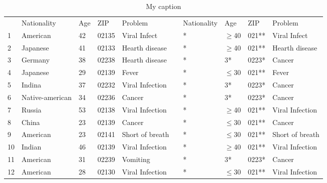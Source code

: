 \documentclass{llncs}
\begin{document}
\begin{table}[]
	\centering
	\caption{My caption}
	\label{my-label}
	\begin{tabular}{@{}llllllllll@{}}
		\cmidrule(lr){2-5} \cmidrule(l){7-10}
		& Nationality     & Age & ZIP   & Problem         &  & Nationality & Age      & ZIP   & Problem         \\ \cmidrule(lr){2-5} \cmidrule(l){7-10} 
		1  & American        & 42  & 02135 & Viral Infect    &  & *           & $\geq$40 & 021** & Viral Infect    \\
		2  & Japanese        & 41  & 02133 & Hearth disease  &  & *           & $\geq$40 & 021** & Hearth disease  \\
		3  & Germany         & 38  & 02238 & Hearth disease  &  & *           & 3*       & 0223* & Cancer          \\
		4  & Japanese        & 29  & 02139 & Fever           &  & *           & $\leq$30 & 021** & Fever           \\
		5  & Indina          & 37  & 02232 & Viral Infection &  & *           & 3*       & 0223* & Cancer          \\
		6  & Native-american & 34  & 02236 & Cancer          &  & *           & 3*       & 0223* & Cancer          \\
		7  & Russia          & 53  & 02138 & Viral Infection &  & *           & $\geq$40 & 021** & Viral Infection \\
		8  & China           & 23  & 02139 & Cancer          &  & *           & $\leq$30 & 021** & Cancer          \\
		9  & American        & 23  & 02141 & Short of breath &  & *           & $\leq$30 & 021** & Short of breath \\
		10 & Indian          & 46  & 02139 & Viral Infection &  & *           & $\geq$40 & 021** & Viral Infection \\
		11 & American        & 31  & 02239 & Vomiting        &  & *           & 3*       & 0223* & Cancer          \\
		12 & American        & 28  & 02130 & Viral Infection &  & *           & $\leq$30 & 021** & Viral Infection \\ \cmidrule(lr){2-5} \cmidrule(l){7-10} 
	\end{tabular}
\end{table}
\end{document}

